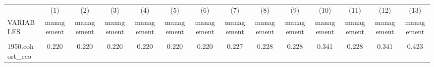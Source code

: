\begin{center}
\begin{tabular}{lccccccccccccc} \hline
 & (1) & (2) & (3) & (4) & (5) & (6) & (7) & (8) & (9) & (10) & (11) & (12) & (13) \\
VARIABLES & management & management & management & management & management & management & management & management & management & management & management & management & management \\ \hline
\vspace{4pt} & \begin{footnotesize}\end{footnotesize} & \begin{footnotesize}\end{footnotesize} & \begin{footnotesize}\end{footnotesize} & \begin{footnotesize}\end{footnotesize} & \begin{footnotesize}\end{footnotesize} & \begin{footnotesize}\end{footnotesize} & \begin{footnotesize}\end{footnotesize} & \begin{footnotesize}\end{footnotesize} & \begin{footnotesize}\end{footnotesize} & \begin{footnotesize}\end{footnotesize} & \begin{footnotesize}\end{footnotesize} & \begin{footnotesize}\end{footnotesize} & \begin{footnotesize}\end{footnotesize} \\
1950.cohort\_ceo & 0.220 & 0.220 & 0.220 & 0.220 & 0.220 & 0.220 & 0.227 & 0.228 & 0.228 & 0.341 & 0.228 & 0.341 & 0.423 \\

\end{tabular}
\end{center}
